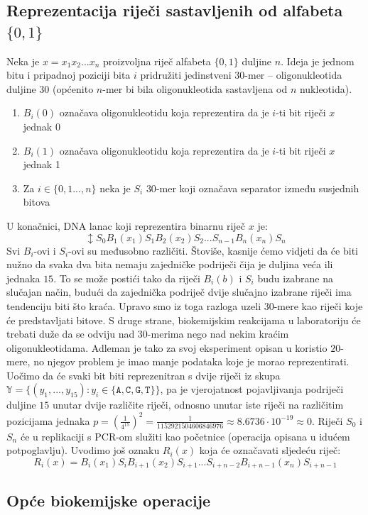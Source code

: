 \documentclass[a4paper,oneside,12pt]{memoir} %
\begin{document}
\begin{spacing}{1.5}
\subsection{Reprezentacija riječi sastavljenih od alfabeta $\{0,1\}$}
\label{subsub:repBit}
Neka je $x=x_1x_2...x_n$ proizvoljna riječ alfabeta $\{0,1\}$ duljine $n$. Ideja je jednom bitu i pripadnoj poziciji bita $i$ pridružiti jedinstveni $30$-mer -- oligonukleotida duljine $30$ (općenito $n$-mer bi bila oligonukleotida sastavljena od $n$ nukleotida). 
\begin{enumerate}
\item $B_i (0)$ označava oligonukleotidu koja reprezentira da je $i$-ti bit riječi $x$ jednak 0
\item $B_i(1)$ označava oligonukleotidu koja reprezentira da je $i$-ti bit riječi $x$ jednak 1
\item Za $i \in \{0,1...,n\}$ neka je $S_i$ $30$-mer koji označava separator između susjednih bitova
\end{enumerate}   
U konačnici, DNA lanac koji reprezentira binarnu riječ $x$ je:
\[\updownarrow S_0 B_1(x_1)S_1B_2(x_2)S_2...S_{n-1}B_n(x_n)S_n\]
Svi $B_i$-ovi i $S_i$-ovi su međusobno različiti. Štoviše, kasnije ćemo vidjeti da će biti nužno da svaka dva bita nemaju zajedničke podriječi čija je duljina veća ili jednaka $15$. To se može postići tako da riječi $B_i(b)$ i $S_i$ budu izabrane na slučajan način, budući da zajednička podriječ dvije slučajno izabrane riječi ima tendenciju biti što kraća. Upravo smo iz toga razloga uzeli $30$-mere kao riječi koje će predstavljati bitove. S druge strane, biokemijskim reakcijama u laboratoriju će trebati duže da se odviju nad $30$-merima nego nad nekim kraćim oligonukleotidama. Adleman je tako za svoj eksperiment opisan u \cite{Adleman} koristio $20$-mere, no njegov problem je imao manje podataka koje je morao reprezentirati. Uočimo da će svaki bit biti reprezenitran s dvije riječi iz skupa $\mathbb{Y}=\{(y_1,...,y_{15}): y_i \in \mathtt{\{A,C,G,T\}\}}$, pa je vjerojatnost pojavljivanja podriječi duljine $15$ unutar dvije različite riječi, odnosno unutar iste riječi na različitim pozicijama jednaka $p=\left(\frac{1}{4^{15}}\right)^2=\frac{1}{1152921504606846976}\approx 8.6736 \cdot 10^{-19}\approx 0$. Riječi $S_0$ i $S_n$ će u replikaciji s PCR-om  služiti kao početnice (operacija opisana u idućem potpoglavlju). Uvodimo još oznaku $R_i(x)$ koja će označavati sljedeću riječ:
\[R_i(x)=B_i(x_1)S_iB_{i+1}(x_2)S_{i+1}...S_{i+n-2}B_{i+n-1}(x_n)S_{i+n-1}\]
\subsection{Opće biokemijske operacije}

\end{spacing}
\end{document}
